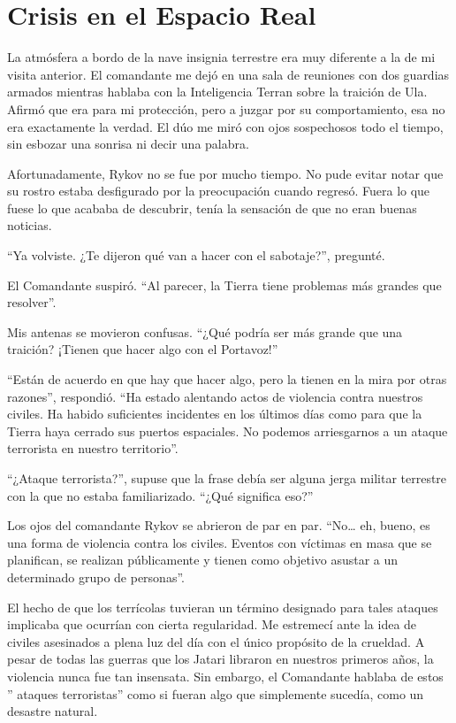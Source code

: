 \chapter{Crisis en el Espacio Real}\label{sec:crisis-en-el-espacio-real}

La atmósfera a bordo de la nave insignia terrestre era muy diferente a la de mi visita anterior. El comandante me dejó en una sala de reuniones con dos guardias armados mientras hablaba con la Inteligencia Terran sobre la traición de Ula. Afirmó que era para mi protección, pero a juzgar por su comportamiento, esa no era exactamente la verdad. El dúo me miró con ojos sospechosos todo el tiempo, sin esbozar una sonrisa ni decir una palabra.

Afortunadamente, Rykov no se fue por mucho tiempo. No pude evitar notar que su rostro estaba desfigurado por la preocupación cuando regresó. Fuera lo que fuese lo que acababa de descubrir, tenía la sensación de que no eran buenas noticias.

``Ya volviste. ¿Te dijeron qué van a hacer con el sabotaje?'', pregunté.

El Comandante suspiró. ``Al parecer, la Tierra tiene problemas más grandes que resolver''.

Mis antenas se movieron confusas. ``¿Qué podría ser más grande que una traición? ¡Tienen que hacer algo con el Portavoz!''


``Están de acuerdo en que hay que hacer algo, pero la tienen en la mira por otras razones'', respondió. ``Ha estado alentando actos de violencia contra nuestros civiles. Ha habido suficientes incidentes en los últimos días como para que la Tierra haya cerrado sus puertos espaciales. No podemos arriesgarnos a un ataque terrorista en nuestro territorio''.

``¿Ataque terrorista?'', supuse que la frase debía ser alguna jerga militar terrestre con la que no estaba familiarizado. ``¿Qué significa eso?''


Los ojos del comandante Rykov se abrieron de par en par. ``No… eh, bueno, es una forma de violencia contra los civiles. Eventos con víctimas en masa que se planifican, se realizan públicamente y tienen como objetivo asustar a un determinado grupo de personas''.

El hecho de que los terrícolas tuvieran un término designado para tales ataques implicaba que ocurrían con cierta regularidad. Me estremecí ante la idea de civiles asesinados a plena luz del día con el único propósito de la crueldad. A pesar de todas las guerras que los Jatari libraron en nuestros primeros años, la violencia nunca fue tan insensata. Sin embargo, el Comandante hablaba de estos ''
ataques terroristas''
 como si fueran algo que simplemente sucedía, como un desastre natural.

